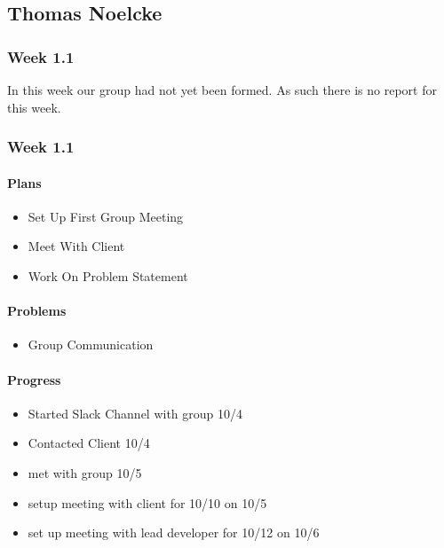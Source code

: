 \documentclass[onecolumn, draftclsnofoot,10pt, compsoc]{article}
\begin{document}
    
    \subsection{Thomas Noelcke}

        \subsubsection {Week 1.1}
        In this week our group had not yet been formed. As such there is no report for this week.
    \subsubsection{Week 1.1}
		
		    \paragraph{Plans} \hfill \break
		    
		    \begin{itemize}
		        \item Set Up First Group Meeting
		        \item Meet With Client
		        \item Work On Problem Statement
		    \end{itemize}
		
		    \paragraph{Problems} \hfill \break
		    
		    \begin{itemize}
		        \item Group Communication 
		    \end{itemize}
		    
		    \paragraph{Progress} \hfill \break
		    \begin{itemize}
		        \item Started Slack Channel with group 10/4
		        \item Contacted Client 10/4
		        \item met with group 10/5
		        \item setup meeting with client for 10/10 on 10/5
		        \item set up meeting with lead developer for 10/12 on 10/6
		    \end{itemize}
		    
\end{document}
